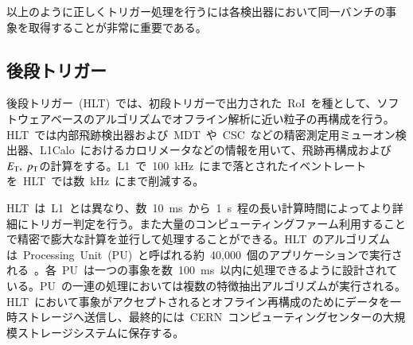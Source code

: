 以上のように正しくトリガー処理を行うには各検出器において同一バンチの事象を取得することが非常に重要である。

\subsection{後段トリガー}
後段トリガー~(HLT)~では、初段トリガーで出力された~RoI~を種として、ソフトウェアベースのアルゴリズムでオフライン解析に近い粒子の再構成を行う。HLT~では内部飛跡検出器および~MDT~や~CSC~などの精密測定用ミューオン検出器、L1Calo~におけるカロリメータなどの情報を用いて、飛跡再構成および$E_{\rm{T}},~p_{\rm{T}}$の計算をする。L1~で~100~kHz~にまで落とされたイベントレートを~HLT~では数~kHz~にまで削減する。

HLT~は~L1~とは異なり、数~10~ms~から~1~s~程の長い計算時間によってより詳細にトリガー判定を行う。また大量のコンピューティングファーム利用することで精密で膨大な計算を並行して処理することができる。HLT~のアルゴリズムは~Processing~Unit~(PU)~と呼ばれる約~40,000~個のアプリケーションで実行される~\cite{AR:15}。各~PU~は一つの事象を数~100~ms~以内に処理できるように設計されている。PU~の一連の処理においては複数の特徴抽出アルゴリズムが実行される。HLT~において事象がアクセプトされるとオフライン再構成のためにデータを一時ストレージへ送信し、最終的には~CERN~コンピューティングセンターの大規模ストレージシステムに保存する。
